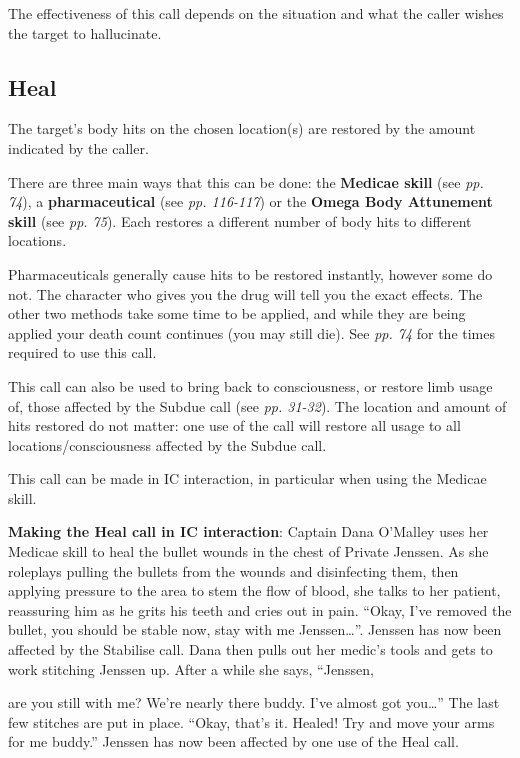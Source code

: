 \documentclass{scrbook}
\begin{document}
The effectiveness of this call depends on the situation and what the caller wishes the target to hallucinate.

\subsection{Heal}

The target's body hits on the chosen location(s) are restored by the amount indicated by the caller.

There are three main ways that this can be done: the \textbf{Medicae skill} (see \textit{pp. 74}), a \textbf{pharmaceutical} (see \textit{pp. 116-117}) or the \textbf{Omega Body Attunement skill} (see \textit{pp. 75}). Each restores a different number of body hits to different locations.

Pharmaceuticals generally cause hits to be restored instantly, however some do not. The character who gives you the drug will tell you the exact effects. The other two methods take some time to be applied, and while they are being applied your death count continues (you may still die). See \textit{pp. 74} for the times required to use this call.

This call can also be used to bring back to consciousness, or restore limb usage of, those affected by the Subdue call (see \textit{pp. 31-32}). The location and amount of hits restored do not matter: one use of the call will restore all usage to all locations/consciousness affected by the Subdue call.

This call can be made in IC interaction, in particular when using the Medicae skill.

\textbf{Making the Heal call in IC interaction}: Captain Dana O'Malley uses her Medicae skill to heal the bullet wounds in the chest of Private Jenssen. As she roleplays pulling the bullets from the wounds and disinfecting them, then applying pressure to the area to stem the flow of blood, she talks to her patient, reassuring him as he grits his teeth and cries out in pain. ``Okay, I've removed the bullet, you should be stable now, stay with me Jenssen{\dots}''. Jenssen has now been affected by the Stabilise call. Dana then pulls out her medic's tools and gets to work stitching Jenssen up. After a while she says, ``Jenssen,

are you still with me? We're nearly there buddy. I've almost got you{\dots}'' The last few stitches are put in place. ``Okay, that's it. Healed! Try and move your arms for me buddy.'' Jenssen has now been affected by one use of the Heal call.
\end{document}

